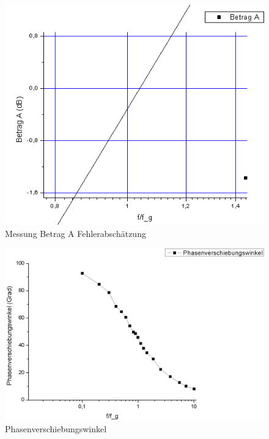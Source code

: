 \documentclass[12pt,a4paper]{article}
\begin{document}
\begin{figure}[H]
	\centering
	\includegraphics[scale=0.60]{./figure/betrag_a_zoom.png}
	\caption{Messung Betrag A Fehlerabschätzung}
	\label{fig:betraga_abweichung}
\end{figure}

\begin{figure}[H]
	\centering
	\includegraphics[scale=0.40]{./figure/phasenverschiebungs.png}
	\caption{Phasenverschiebungswinkel}
	\label{fig:betraga_phase}
\end{figure}
\end{document}
